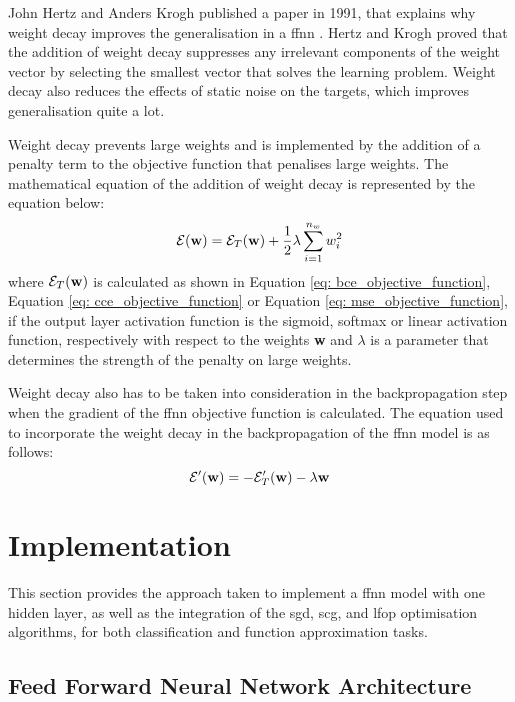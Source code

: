 \documentclass[10pt, conference]{IEEEtran}
\begin{document}
John Hertz and Anders Krogh published a paper in 1991, that explains why weight decay improves the generalisation
in a \acrshort{ffnn} \cite{weight_decay_ref}. Hertz and Krogh proved that the addition of weight decay suppresses
any irrelevant components of the weight vector by selecting the smallest vector that solves the learning problem.
Weight decay also reduces the effects of static noise on the targets, which improves generalisation quite a lot.

Weight decay prevents large weights and is implemented by the addition of a penalty term to the objective function
that penalises large weights. The mathematical equation of the addition of weight decay is represented by the
equation below:
\begin{equation}
    \mathcal{E}(\text{\textbf{w}}) = \mathcal{E}_T(\text{\textbf{w}}) + \frac{1}{2} \lambda \sum_{i=1}^{n_w}w_i^2 \label{eq: weight_decay}
\end{equation}
where $\mathcal{E}_T(\text{\textbf{w}})$ is calculated as shown in Equation \ref{eq: bce_objective_function},
Equation \ref{eq: cce_objective_function} or Equation \ref{eq: mse_objective_function}, if the output layer
activation function is the sigmoid, softmax or linear activation function, respectively with respect to
the weights \textbf{w} and $\lambda$ is a parameter that determines the strength of the penalty on large weights.

Weight decay also has to be taken into consideration in the backpropagation step when the gradient of the \acrshort{ffnn}
objective function is calculated. The equation used to incorporate the weight decay in the backpropagation of the
\acrshort{ffnn} model is as follows:
\begin{equation}
    \mathcal{E}'(\text{\textbf{w}}) = -\mathcal{E}_T'(\text{\textbf{w}}) - \lambda \text{\textbf{w}} \label{eq: weight_decay_gradient}
\end{equation}

\section{Implementation} \label{section: Implementation}

This section provides the approach taken to implement a \acrshort{ffnn} model with one hidden layer, as well as the integration
of the \acrshort{sgd}, \acrshort{scg}, and \acrshort{lfop} optimisation algorithms, for both classification and function
approximation tasks.

\subsection{Feed Forward Neural Network Architecture}
\end{document}
